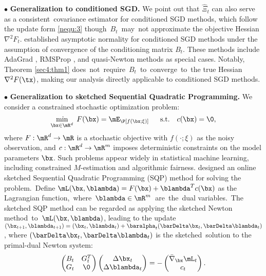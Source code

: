 \vskip4pt
\noindent$\bullet$ \textbf{Generalization to conditioned SGD.} 
We point out that $\hat{\Xi}_t$ can also serve as a consistent~covariance estimator for conditioned SGD methods, which follow the update form \eqref{nequ:3} though~$B_t$~may~not approximate the objective Hessian $\nabla^2F_t$. \cite{Leluc2023Asymptotic} established asymptotic normality for conditioned SGD methods under the assumption of convergence of the conditioning matrix $B_t$. These methods include AdaGrad \citep{Duchi2011Adaptive}, RMSProp \citep{Tieleman2012Lecture}, and quasi-Newton methods \citep{Byrd2016Stochastic} as special cases.  
Notably, Theorem \ref{sec4:thm1} does~not~\mbox{require}~$B_t$~to~\mbox{converge}~to~the true Hessian $\nabla^2 F(\tx)$, making our analysis directly applicable to conditioned SGD methods.


\vskip4pt
\noindent$\bullet$ \textbf{Generalization to sketched Sequential Quadratic Programming.} 
We consider a constrained stochastic optimization problem:
\begin{equation*}
\min_{\bx\in\mR^d}\; F(\bx) = \mE_\P[f(\bx;\xi)] \quad\;\;\text{s.t.}\quad c(\bx)=\0,
\end{equation*}
where $F:\mR^d\rightarrow\mR$ is a stochastic objective with $f(\cdot;\xi)$ as the noisy observation, and $c:\mR^d\rightarrow \mR^m$ imposes deterministic constraints on the model parameters $\bx$. Such problems appear widely in statistical machine learning, including constrained $M$-estimation and algorithmic fairness. \cite{Na2022Statistical} designed an online sketched Sequential Quadratic Programming (SQP) method for solving the problem.~Define $\mL(\bx, \blambda) = F(\bx) + \blambda^Tc(\bx)$ as the Lagrangian function,~where~\mbox{$\blambda \in \mR^m$}~are~the~dual variables.~The sketched SQP method can be regarded as applying the sketched Newton method~to~$\mL(\bx, \blambda)$, leading to the update $(\bx_{t+1}, \blambda_{t+1}) = (\bx_t, \blambda_t)+ \baralpha_t(\barDelta \bx_t, \barDelta\blambda_t)$, where $(\barDelta \bx_t, \barDelta \blambda_t)$ is the sketched~solution to the primal-dual Newton system:
\begin{equation*}
\begin{pmatrix}
B_t & G_t^T\\
G_t & \0
\end{pmatrix}\begin{pmatrix}
\Delta \bx_t\\
\Delta\blambda_t
\end{pmatrix} = -\begin{pmatrix}
\bar{\nabla}_\bx\mL_t\\
c_t
\end{pmatrix}.
\end{equation*}
